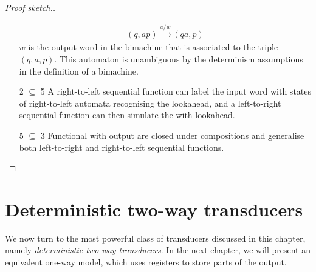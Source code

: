 \begin{proof}[Proof sketch.]
\begin{itemize}
\begin{align*}
(q,a p) \stackrel {a/w} \to (q a, p)	
\end{align*}
$w$ is the output word in the bimachine that is associated to the triple $(q,a,p)$. This automaton is unambiguous by the determinism assumptions in the definition of a bimachine.
\item[2 $\subseteq$ 5] A right-to-left sequential function can label the input word with states of right-to-left automata recognising the lookahead, and a left-to-right  sequential function can then simulate the \dfa with lookahead.
\item[5 $\subseteq$ 3] Functional \nfa with output are closed under compositions and  generalise both left-to-right and right-to-left sequential functions.
\end{itemize}	

\end{proof}



\section{Deterministic two-way transducers}
We now turn to the most powerful class of transducers discussed in this chapter, namely \emph{deterministic two-way transducers}. In the next chapter, we will present an equivalent one-way model, which uses registers to store parts of the output.

